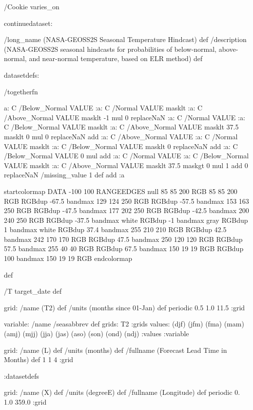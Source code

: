 \begin{ingrid}

/Cookie varies_on

continuedataset:

/long_name (NASA-GEOSS2S Seasonal Temperature Hindcast) def
/description (NASA-GEOSS2S seasonal hindcasts for probabilities of below-normal, above-normal, and near-normal temperature, based on ELR method) def

datasetdefs:

/togetherfn {
 a:
    C /Below_Normal VALUE
    :a:
     C /Normal VALUE
     masklt
    :a:
     C /Above_Normal VALUE
     masklt
    -1 mul
    0 replaceNaN
    :a:
     C /Normal VALUE
     :a:
      C /Below_Normal VALUE
      masklt
     :a:
      C /Above_Normal VALUE
      masklt
     37.5 masklt
     0 mul
     0 replaceNaN           
     add
    :a:
     C /Above_Normal VALUE
     :a:
      C /Normal VALUE
      masklt
     :a:
      C /Below_Normal VALUE
      masklt
     0 replaceNaN
     add
 :a:
     C /Below_Normal VALUE
     0 mul
     add
    :a:
     C /Normal VALUE
     :a:
      C /Below_Normal VALUE
      masklt
     :a:
      C /Above_Normal VALUE        
      masklt
     37.5 maskgt
     0 mul
     1 add
     0 replaceNaN
     /missing_value 1 def
     add
    :a

startcolormap
DATA -100 100 RANGEEDGES
null 85 85 200 RGB
85 85 200 RGB RGBdup -67.5 bandmax
129 124 250 RGB RGBdup -57.5 bandmax
153 163 250 RGB RGBdup -47.5 bandmax
177 202 250 RGB RGBdup -42.5 bandmax
200 240 250 RGB RGBdup -37.5 bandmax
white RGBdup -1 bandmax
gray RGBdup 1 bandmax
white RGBdup 37.4 bandmax
255 210 210 RGB RGBdup 42.5 bandmax
242 170 170 RGB RGBdup 47.5 bandmax
250 120 120 RGB RGBdup 57.5 bandmax
255 40 40 RGB RGBdup 67.5 bandmax
150 19 19 RGB RGBdup 100 bandmax
150 19 19 RGB
endcolormap
} def 

/T {target_date} def

grid:
/name (T2) def
/units (months since 01-Jan) def
periodic
0.5 1.0 11.5
:grid

variable:
/name /seasabbrev def
grids: T2 :grids
values: (djf) (jfm) (fma) (mam) (amj) (mjj) (jja) (jas) (aso) (son) (ond) (ndj) :values
:variable

 grid:
 /name (L) def
 /units (months) def
 /fullname (Forecast Lead Time in Months) def
 1 1 4
 :grid

:datasetdefs

grid:
/name (X) def
/units (degreeE) def
/fullname (Longitude) def
periodic
0. 1.0 359.0
:grid


\end{ingrid}
